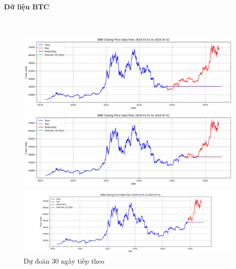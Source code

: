 \documentclass[conference]{IEEEtran}
\begin{document}
	\paragraph{\textbf{Dữ liệu BTC}} \mbox{} \\
	\begin{figure}[H]
		\centering
		\begin{minipage}{0.15\textwidth}
			\centering
			\includegraphics[width=1\textwidth]{Figure/ARIMA_BTC_30days_73.png}
		\end{minipage}
		\hfill
		\begin{minipage}{0.15\textwidth}
			\centering
			\includegraphics[width=1\textwidth]{Figure/ARIMA_BTC_30days_82.png}
		\end{minipage}
		\hfill
		\begin{minipage}{0.15\textwidth}
			\centering
			\includegraphics[width=1\textwidth]{Figure/ARIMA_BTC_30days_91.png}
		\end{minipage}
		\caption{Dự đoán 30 ngày tiếp theo}
		\label{fig:1}
	\end{figure}
	
\end{document}
